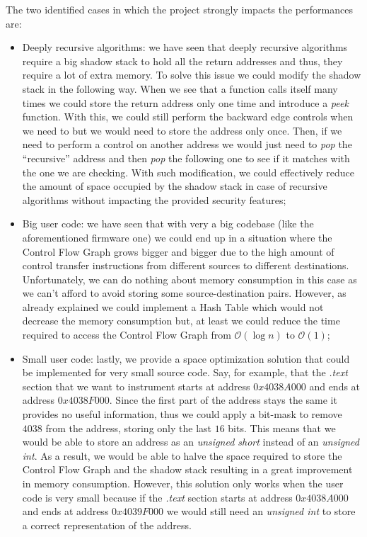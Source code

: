 The two identified cases in which the project strongly impacts the performances
are:
\begin{itemize}
  \item Deeply recursive algorithms: we have seen that deeply recursive
    algorithms require a big shadow stack to hold all the return addresses and
    thus, they require a lot of extra memory. To solve this issue we could
    modify the shadow stack in the following way. When we see that a function calls
    itself many times we could store the return address only one time and introduce
    a \textit{peek} function. With this, we could still perform the backward
    edge controls when we need to but we would need to store the address only
    once. Then, if we need to perform a control on another address we would just
    need to \textit{pop} the ``recursive'' address and then \textit{pop} the
    following one to see if it matches with the one we are checking. With such modification,
    we could effectively reduce the amount of space occupied by the shadow stack
    in case of recursive algorithms without impacting the provided security
    features;

  \item Big user code: we have seen that with very a big codebase (like the aforementioned
    firmware one) we could end up in a situation where the Control Flow Graph
    grows bigger and bigger due to the high amount of control transfer
    instructions from different sources to different destinations. Unfortunately,
    we can do nothing about memory consumption in this case as we can't afford
    to avoid storing some source-destination pairs. However, as already
    explained we could implement a Hash Table which would not decrease the
    memory consumption but, at least we could reduce the time required to access
    the Control Flow Graph from $\mathcal{O}(\log{n})$ to $\mathcal{O}(1)$;

  \item Small user code: lastly, we provide a space optimization solution that could
    be implemented for very small source code. Say, for example, that the
    \textit{.text} section that we want to instrument starts at address $0x4038A0
    00$ and ends at address $0x4038F000$. Since the first part of the address
    stays the same it provides no useful information, thus we could apply a bit-mask
    to remove $4038$ from the address, storing only the last $16$ bits. This means
    that we would be able to store an address as an \textit{unsigned short}
    instead of an \textit{unsigned int}. As a result, we would be able to halve the
    space required to store the Control Flow Graph and the shadow stack resulting
    in a great improvement in memory consumption. However, this solution only works
    when the user code is very small because if the \textit{.text} section
    starts at address $0x4038A000$ and ends at address $0x4039F000$ we would
    still need an \textit{unsigned int} to store a correct representation of the
    address.
\end{itemize}

